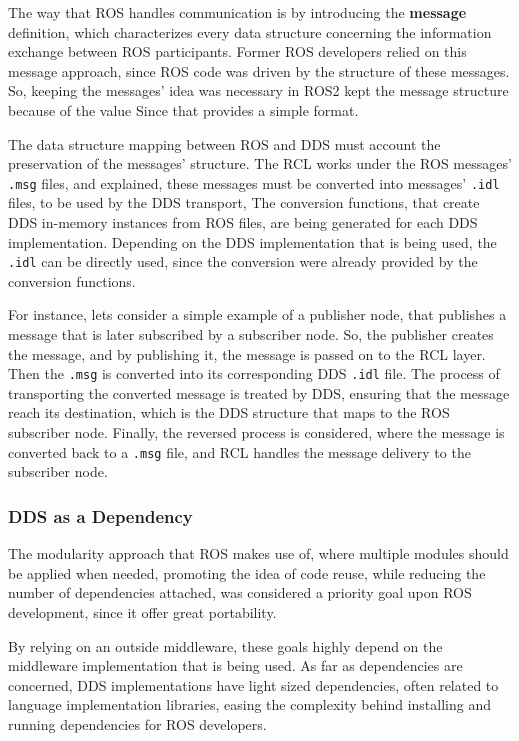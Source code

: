 The way that ROS handles communication is by introducing the \textbf{message} definition, which characterizes every data structure concerning the information exchange between ROS participants. Former ROS developers relied on this message approach, since ROS code was driven by the structure of these messages. So, keeping the messages' idea was necessary in ROS2 kept the message structure because of the value  Since that provides a simple format.  

The data structure mapping between ROS and DDS must account the preservation of the messages' structure. The RCL works under the ROS messages' \texttt{.msg} files, and explained, these messages must be converted into messages' \texttt{.idl} files, to be used by the DDS transport, The conversion functions, that create DDS in-memory instances from ROS files, are being generated for each DDS implementation. Depending on the DDS implementation that is being used, the \texttt{.idl} can be directly used, since the conversion were already provided by the conversion functions.
    
For instance, lets consider a simple example of a publisher node, that publishes a message that is later subscribed by a subscriber node. So, the publisher creates the message, and by publishing it, the message is passed on to the RCL layer. Then the \texttt{.msg} is converted into its corresponding DDS \texttt{.idl} file. The process of transporting the converted message is treated by DDS, ensuring that the message reach its destination, which is the DDS structure that maps to the ROS subscriber node. Finally, the reversed process is considered, where the message is converted back to a \texttt{.msg} file, and RCL handles the message delivery to the subscriber node. 


\subsubsection{DDS as a Dependency}

The modularity approach that ROS makes use of, where multiple modules should be applied when needed, promoting the idea of code reuse, while reducing the number of dependencies attached, was considered a priority goal upon ROS development, since it offer great portability.
                
By relying on an outside middleware, these goals highly depend on the middleware implementation that is being used. As far as dependencies are concerned, DDS implementations have light sized dependencies, often related to language implementation libraries, easing the complexity behind installing and running dependencies for ROS developers.


